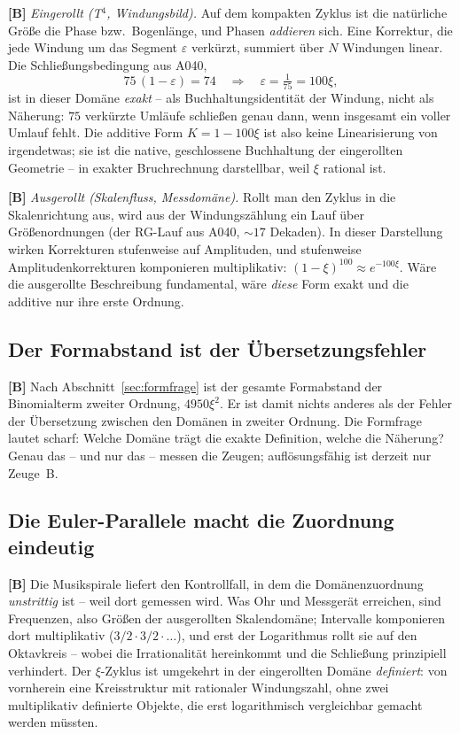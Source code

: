 \textbf{[B]} \emph{Eingerollt (T$^4$, Windungsbild).} Auf dem kompakten
Zyklus ist die nat\"urliche Gr\"o\ss e die Phase bzw.\ Bogenl\"ange, und
Phasen \emph{addieren} sich. Eine Korrektur, die jede Windung um das
Segment $\varepsilon$ verk\"urzt, summiert \"uber $N$ Windungen linear.
Die Schlie\ss ungsbedingung aus A040,
\[
  75\,(1-\varepsilon) = 74 \quad\Rightarrow\quad \varepsilon = \tfrac1{75}
  = 100\xi,
\]
ist in dieser Dom\"ane \emph{exakt} -- als Buchhaltungsidentit\"at der
Windung, nicht als N\"aherung: $75$ verk\"urzte Uml\"aufe schlie\ss en
genau dann, wenn insgesamt ein voller Umlauf fehlt. Die additive Form
$K = 1-100\xi$ ist also keine Linearisierung von irgendetwas; sie ist die
native, geschlossene Buchhaltung der eingerollten Geometrie -- in exakter
Bruchrechnung darstellbar, weil $\xi$ rational ist.

\textbf{[B]} \emph{Ausgerollt (Skalenfluss, Messdom\"ane).} Rollt man den
Zyklus in die Skalenrichtung aus, wird aus der Windungsz\"ahlung ein Lauf
\"uber Gr\"o\ss enordnungen (der RG-Lauf aus A040, $\sim17$ Dekaden). In
dieser Darstellung wirken Korrekturen stufenweise auf Amplituden, und
stufenweise Amplitudenkorrekturen komponieren multiplikativ:
$(1-\xi)^{100}\approx e^{-100\xi}$. W\"are die ausgerollte Beschreibung
fundamental, w\"are \emph{diese} Form exakt und die additive nur ihre
erste Ordnung.

\subsection{Der Formabstand ist der \"Ubersetzungsfehler}

\textbf{[B]} Nach Abschnitt~\ref{sec:formfrage} ist der gesamte
Formabstand der Binomialterm zweiter Ordnung, $4950\xi^2$. Er ist damit
nichts anderes als der Fehler der \"Ubersetzung zwischen den Dom\"anen in
zweiter Ordnung. Die Formfrage lautet scharf: Welche Dom\"ane tr\"agt die
exakte Definition, welche die N\"aherung? Genau das -- und nur das --
messen die Zeugen; aufl\"osungsf\"ahig ist derzeit nur Zeuge~B.

\subsection{Die Euler-Parallele macht die Zuordnung eindeutig}

\textbf{[B]} Die Musikspirale liefert den Kontrollfall, in dem die
Dom\"anenzuordnung \emph{unstrittig} ist -- weil dort gemessen wird. Was
Ohr und Messger\"at erreichen, sind Frequenzen, also Gr\"o\ss en der
ausgerollten Skalendom\"ane; Intervalle komponieren dort multiplikativ
($3/2\cdot3/2\cdot\ldots$), und erst der Logarithmus rollt sie auf den
Oktavkreis -- wobei die Irrationalit\"at hereinkommt und die
Schlie\ss ung prinzipiell verhindert. Der $\xi$-Zyklus ist umgekehrt in
der eingerollten Dom\"ane \emph{definiert}: von vornherein eine
Kreisstruktur mit rationaler Windungszahl, ohne zwei multiplikativ
definierte Objekte, die erst logarithmisch vergleichbar gemacht werden
m\"ussten.

